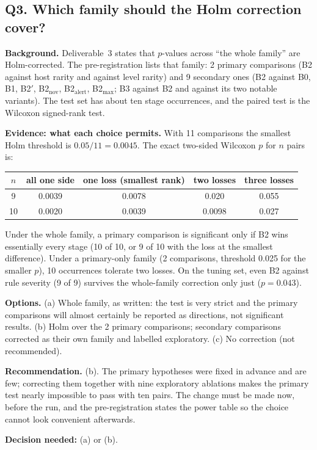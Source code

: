 \documentclass[10.5pt,a4paper]{article}
\newcommand{\rec}[1]{\par\smallskip\noindent\colorbox{gray!12}{\parbox{\dimexpr\linewidth-2\fboxsep}{\textbf{Recommendation.} #1}}\par\smallskip}
\newcommand{\ask}[1]{\par\noindent\textbf{Decision needed:} #1\par\medskip}
\newcommand{\sub}[1]{\par\smallskip\noindent\textbf{#1}\quad}
\begin{document}
\subsection*{Q3. Which family should the Holm correction cover?}

\sub{Background.} Deliverable~3 states that $p$-values across ``the whole family'' are Holm-corrected. The pre-registration lists that family: 2 primary comparisons (B2 against host rarity and against level rarity) and 9 secondary ones (B2 against B0, B1, B2$'$, B2$_\mathrm{nov}$, B2$_\mathrm{alert}$, B2$_\mathrm{max}$; B3 against B2 and against its two notable variants). The test set has about ten stage occurrences, and the paired test is the Wilcoxon signed-rank test.

\sub{Evidence: what each choice permits.} With 11 comparisons the smallest Holm threshold is $0.05/11 = 0.0045$. The exact two-sided Wilcoxon $p$ for $n$ pairs is:

\begin{center}\small
\begin{tabular}{@{}c c c c c@{}}
\toprule
$n$ & all one side & one loss (smallest rank) & two losses & three losses \\
\midrule
9 & 0.0039 & 0.0078 & 0.020 & 0.055 \\
10 & 0.0020 & 0.0039 & 0.0098 & 0.027 \\
\bottomrule
\end{tabular}
\end{center}

Under the whole family, a primary comparison is significant only if B2 wins essentially every stage (10 of 10, or 9 of 10 with the loss at the smallest difference). Under a primary-only family (2 comparisons, threshold 0.025 for the smaller $p$), 10 occurrences tolerate two losses. On the tuning set, even B2 against rule severity (9 of 9) survives the whole-family correction only just ($p = 0.043$).

\sub{Options.} (a) Whole family, as written: the test is very strict and the primary comparisons will almost certainly be reported as directions, not significant results. (b) Holm over the 2 primary comparisons; secondary comparisons corrected as their own family and labelled exploratory. (c) No correction (not recommended).

\rec{(b). The primary hypotheses were fixed in advance and are few; correcting them together with nine exploratory ablations makes the primary test nearly impossible to pass with ten pairs. The change must be made now, before the run, and the pre-registration states the power table so the choice cannot look convenient afterwards.}
\ask{(a) or (b).}
\end{document}
